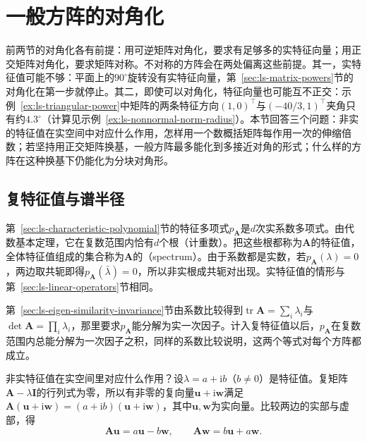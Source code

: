 
\section{一般方阵的对角化}
\label{sec:ls-general-square-spectrum}

前两节的对角化各有前提：用可逆矩阵对角化，要求有足够多的实特征向量；用正交矩阵对角化，要求矩阵对称。不对称的方阵会在两处偏离这些前提。其一，实特征值可能不够：平面上的$90^\circ$旋转没有实特征向量，第~\ref{sec:ls-matrix-powers}节的对角化在第一步就停止。其二，即使可以对角化，特征向量也可能互不正交：示例~\ref{ex:ls-triangular-power}中矩阵的两条特征方向$(1,0)^\top$与$(-40/3,1)^\top$夹角只有约$4.3^\circ$（计算见示例~\ref{ex:ls-nonnormal-norm-radius}）。本节回答三个问题：非实的特征值在实空间中对应什么作用，怎样用一个数概括矩阵每作用一次的伸缩倍数；若坚持用正交矩阵换基，一般方阵最多能化到多接近对角的形式；什么样的方阵在这种换基下仍能化为分块对角形。

\subsection{复特征值与谱半径}

第~\ref{sec:ls-characteristic-polynomial}节的特征多项式$p_{\bm A}$是$d$次实系数多项式。由代数基本定理，它在复数范围内恰有$d$个根（计重数）。把这些根都称为$\bm A$的特征值，全体特征值组成的集合称为$\bm A$的（spectrum）。由于系数都是实数，若$p_{\bm A}(\lambda)=0$，两边取共轭即得$p_{\bm A}(\bar\lambda)=0$，所以非实根成共轭对出现。实特征值的情形与第~\ref{sec:ls-linear-operators}节相同。

第~\ref{sec:ls-eigen-similarity-invariance}节由系数比较得到$\operatorname{tr}\bm A=\sum_i\lambda_i$与$\det\bm A=\prod_i\lambda_i$，那里要求$p_{\bm A}$能分解为实一次因子。计入复特征值以后，$p_{\bm A}$在复数范围内总能分解为一次因子之积，同样的系数比较说明，这两个等式对每个方阵都成立。

非实特征值在实空间里对应什么作用？设$\lambda=a+\mathrm ib$（$b\neq0$）是特征值。复矩阵$\bm A-\lambda\bm I$的行列式为零，所以有非零的复向量$\bm u+\mathrm i\bm w$满足$\bm A(\bm u+\mathrm i\bm w)=(a+\mathrm ib)(\bm u+\mathrm i\bm w)$，其中$\bm u,\bm w$为实向量。比较两边的实部与虚部，得
\[
 \bm A\bm u=a\bm u-b\bm w,\qquad \bm A\bm w=b\bm u+a\bm w .
\]

